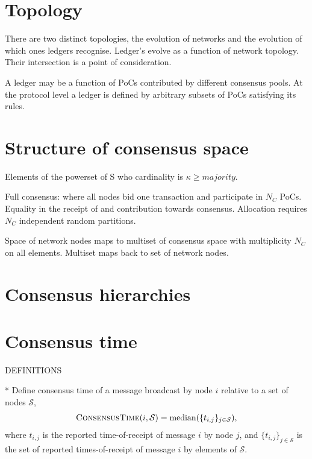 \section{Topology}

There are two distinct topologies, the evolution of networks and the evolution of which ones ledgers recognise.
Ledger’s evolve as a function of network topology.
Their intersection is a point of consideration.

A ledger may be a function of PoCs contributed by different consensus pools. At the protocol level a ledger is defined by arbitrary subsets of PoCs satisfying its rules.

\section{Structure of consensus space}

Elements of the powerset of S who cardinality is $\kappa\geq majority$.

Full consensus: where all nodes bid one transaction and participate in $N_C$ PoCs. Equality in the receipt of and contribution towards consensus. Allocation requires $N_C$ independent random partitions.

Space of network nodes maps to multiset of consensus space with multiplicity $N_C$ on all elements. Multiset maps back to set of network nodes.

\section{Consensus hierarchies}


\section{Consensus time}

DEFINITIONS

* Define consensus time of a message broadcast by node $i$ relative to a set of nodes $\mathcal{S}$,
\begin{align}
	\textsc{ConsensusTime}(i,\mathcal{S}) = \mathrm{median}(\{t_{i,j}\}_{j\in\mathcal{S}}),
\end{align}
where $t_{i,j}$ is the reported time-of-receipt of message $i$ by node $j$, and $\{t_{i,j}\}_{j\in\mathcal{S}}$ is the set of reported times-of-receipt of message $i$ by elements of $\mathcal{S}$.

